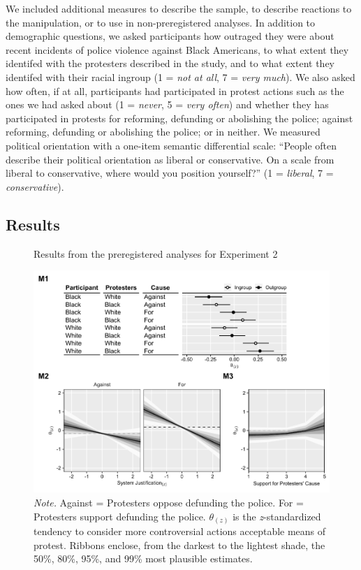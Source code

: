 \documentclass[twocolumn, 11pt, letterpaper]{article}
\begin{document}
We included additional measures to describe the sample, to describe
reactions to the manipulation, or to use in non-preregistered analyses.
In addition to demographic questions, we asked participants how outraged
they were about recent incidents of police violence against Black
Americans, to what extent they identifed with the protesters described
in the study, and to what extent they identifed with their racial
ingroup (1 = \emph{not at all}, 7 = \emph{very much}). We also asked how
often, if at all, participants had participated in protest actions such
as the ones we had asked about (1 = \emph{never}, 5 = \emph{very often})
and whether they has participated in protests for reforming, defunding
or abolishing the police; against reforming, defunding or abolishing the
police; or in neither. We measured political orientation with a one-item
semantic differential scale: ``People often describe their political
orientation as liberal or conservative. On a scale from liberal to
conservative, where would you position yourself?'' (1 = \emph{liberal},
7 = \emph{conservative}).

\hypertarget{results-1}{%
\subsection{Results}\label{results-1}}

\begin{figure}[!t]
\centering
\caption{Results from the preregistered analyses for Experiment 2}
\includegraphics[scale=1]{../Experiment 2/figures/figure-4}
\caption*{\textit{Note.} Against = Protesters oppose defunding the police. For = Protesters support defunding the police. $\theta_{(z)}$ is the \textit{z}-standardized tendency to consider more controversial actions acceptable means of protest. Ribbons enclose, from the darkest to the lightest shade, the 50\%, 80\%, 95\%, and 99\% most plausible estimates.}
\label{fig:f4}
\end{figure}
\end{document}
